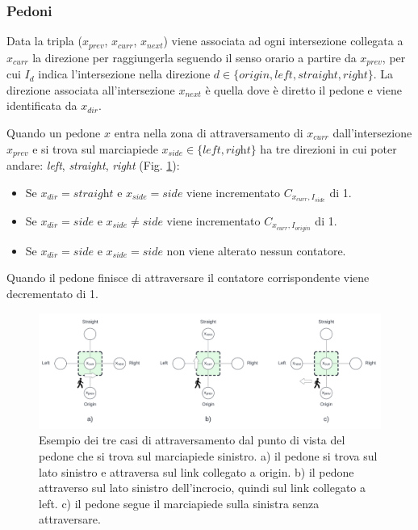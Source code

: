 \subsubsection*{Pedoni}

Data la tripla ($x_{prev}$, $x_{curr}$, $x_{next}$) viene associata ad ogni intersezione collegata a $x_{curr}$ la direzione per raggiungerla seguendo il senso orario a partire da $x_{prev}$,
per cui $I_d$ indica l'intersezione nella direzione $d \in \{\textit{origin}, \textit{left}, \textit{straight}, \textit{right}\}$.
%
La direzione associata all'intersezione $x_{next}$ è quella dove è diretto il pedone e viene identificata da $x_{dir}$.

Quando un pedone $x$ entra nella zona di attraversamento di $x_{curr}$ dall'intersezione $x_{prev}$ e si trova sul marciapiede $x_{side} \in \{ \textit{left}, \textit{right} \}$ 
ha tre direzioni in cui poter andare: \textit{left}, \textit{straight}, \textit{right} (Fig. \ref{fig:pedestria-crossing}):
\begin{itemize}
    \item Se $x_{dir} = \textit{straight}$ e $x_{side} = \textit{side}$ viene incrementato $C_{x_{curr}, I_{\textit{side}}}$ di 1.
    \item Se $x_{dir} = \textit{side}$ e $x_{side} \neq \textit{side}$ viene incrementato $C_{x_{curr}, I_{\textit{origin}}}$ di 1.
    \item Se  $x_{dir} = \textit{side}$ e $x_{side} = \textit{side}$ non viene alterato nessun contatore.
\end{itemize}

Quando il pedone finisce di attraversare il contatore corrispondente viene decrementato di 1.


\begin{figure}[ht]
    \centering
    \includegraphics[width=\textwidth]{images/pedestrian_crossing}
    \caption{
        Esempio dei tre casi di attraversamento dal punto di vista del pedone che si trova sul marciapiede sinistro.
        a) il pedone si trova sul lato sinistro e attraversa sul link collegato a origin.
        b) il pedone attraverso sul lato sinistro dell'incrocio, quindi sul link collegato a left.
        c) il pedone segue il marciapiede sulla sinistra senza attraversare.
    }
    \label{fig:pedestria-crossing}
\end{figure}


